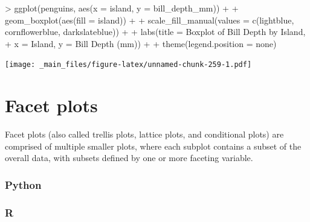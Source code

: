 \documentclass[
]{book}
\newenvironment{Shaded}{\begin{snugshade}}{\end{snugshade}}
\newcommand{\AttributeTok}[1]{\textcolor[rgb]{0.77,0.63,0.00}{#1}}
\newcommand{\FunctionTok}[1]{\textcolor[rgb]{0.00,0.00,0.00}{#1}}
\newcommand{\NormalTok}[1]{#1}
\newcommand{\SpecialCharTok}[1]{\textcolor[rgb]{0.00,0.00,0.00}{#1}}
\newcommand{\StringTok}[1]{\textcolor[rgb]{0.31,0.60,0.02}{#1}}
\begin{document}
\begin{Shaded}
\begin{Highlighting}[]
\SpecialCharTok{\textgreater{}} \FunctionTok{ggplot}\NormalTok{(penguins, }\FunctionTok{aes}\NormalTok{(}\AttributeTok{x =}\NormalTok{ island, }\AttributeTok{y =}\NormalTok{ bill\_depth\_mm)) }\SpecialCharTok{+}
\SpecialCharTok{+}   \FunctionTok{geom\_boxplot}\NormalTok{(}\FunctionTok{aes}\NormalTok{(}\AttributeTok{fill =}\NormalTok{ island)) }\SpecialCharTok{+}
\SpecialCharTok{+}   \FunctionTok{scale\_fill\_manual}\NormalTok{(}\AttributeTok{values =} \FunctionTok{c}\NormalTok{(}\StringTok{\textquotesingle{}lightblue\textquotesingle{}}\NormalTok{, }\StringTok{\textquotesingle{}cornflowerblue\textquotesingle{}}\NormalTok{, }\StringTok{\textquotesingle{}darkslateblue\textquotesingle{}}\NormalTok{)) }\SpecialCharTok{+}
\SpecialCharTok{+}   \FunctionTok{labs}\NormalTok{(}\AttributeTok{title =} \StringTok{\textquotesingle{}Boxplot of Bill Depth by Island\textquotesingle{}}\NormalTok{, }
\SpecialCharTok{+}        \AttributeTok{x =} \StringTok{\textquotesingle{}Island\textquotesingle{}}\NormalTok{, }\AttributeTok{y =} \StringTok{\textquotesingle{}Bill Depth (mm)\textquotesingle{}}\NormalTok{) }\SpecialCharTok{+}
\SpecialCharTok{+}   \FunctionTok{theme}\NormalTok{(}\AttributeTok{legend.position =} \StringTok{\textquotesingle{}none\textquotesingle{}}\NormalTok{)}
\end{Highlighting}
\end{Shaded}

\texttt{[image: \_main\_files/figure-latex/unnamed-chunk-259-1.pdf]}

\hypertarget{facet-plots}{%
\section{Facet plots}\label{facet-plots}}

Facet plots (also called trellis plots, lattice plots, and conditional plots) are comprised of multiple smaller plots, where each subplot contains a subset of the overall data, with subsets defined by one or more faceting variable.

\hypertarget{python-44}{%
\subsubsection*{Python}\label{python-44}}

\hypertarget{r-44}{%
\subsubsection*{R}\label{r-44}}
\end{document}
